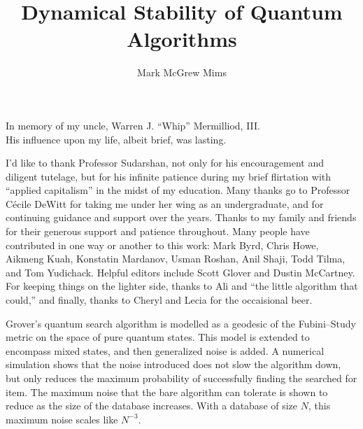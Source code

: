 \documentclass[12pt]{report} %
\author{Mark McGrew Mims}  %
\title{Dynamical Stability of Quantum Algorithms}
\theoremstyle{definition}
\theoremstyle{remark}
\begin{document}
\copyrightpage                  %

\titlepage                      %

\signaturepage                  %


\begin{dedication}              %
%
In memory of my uncle, Warren J. ``Whip'' Mermilliod, III.  \\
His influence upon my life, albeit brief, was lasting.
\end{dedication}


\begin{acknowledgments}

I'd like to thank Professor Sudarshan, not only 
for his encouragement and diligent tutelage, but for his 
infinite patience during my brief flirtation with 
``applied capitalism'' in the midst of my education.
%
Many thanks go to Professor C\'ecile DeWitt for taking
me under her wing as an undergraduate, and for 
continuing guidance and support over the years.
%
Thanks to my family and friends for
their generous support and patience throughout.
%
Many people have contributed in one way or another
to this work:
Mark Byrd,
Chris Howe,
Aikmeng Kuah,
Konstatin Mardanov,
Usman Roshan,
Anil Shaji,
Todd Tilma,
and Tom Yudichack.
Helpful editors include Scott Glover and Dustin McCartney.
For keeping things on the lighter side, thanks to Ali
and ``the little algorithm that could,''  and finally,
thanks to Cheryl and Lecia for the occaisional beer.
\end{acknowledgments}

\utabstract       %

Grover's quantum search algorithm is modelled as a geodesic
of the Fubini--Study metric on the %
space of pure quantum states.  This model is extended to
encompass mixed states, and then generalized noise is added.
A numerical simulation shows that 
the noise introduced does not slow the algorithm down, but only
reduces the maximum probability of successfully finding the 
searched for item.  The maximum noise that the bare algorithm
can tolerate is shown to reduce as the size of the database
increases.  With a database of size $N$, this maximum noise 
scales like $N^{-3}$.
\end{document}
